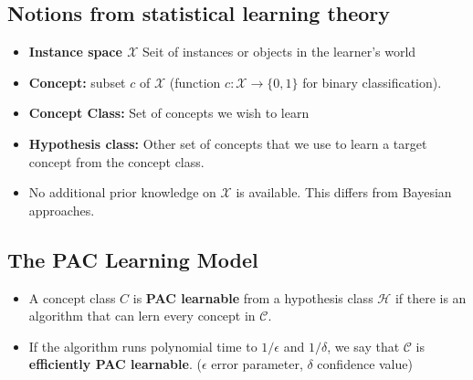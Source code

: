 \subsection{Notions from statistical learning theory}
\begin{itemize}
	\item \textbf{Instance space $\mathcal X$} Seit of instances or objects in the learner's world
	\item \textbf{Concept: } subset $c$ of $\mathcal X$ (function $c:\mathcal X\to \{0,1\}$ for binary classification).
	\item \textbf{Concept Class: } Set of concepts we wish to learn
	\item \textbf{Hypothesis class: } Other set of concepts that we use to learn a target concept from the concept class.
	\item No additional prior knowledge on $\mathcal X$ is available. This differs from Bayesian approaches.
\end{itemize}



\subsection{The PAC Learning Model}
\begin{itemize}
	\item A concept class $C$ is \textbf{PAC learnable} from a hypothesis class $\mathcal H$ if there is an algorithm that can lern every concept in $\mathcal C$.
	\item If the algorithm runs polynomial time to $1/\epsilon$ and $1/\delta$, we say that $\mathcal C$ is \textbf{efficiently PAC learnable}. ($\epsilon$ error parameter, $\delta$ confidence value)
\end{itemize}







